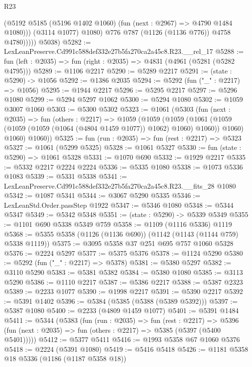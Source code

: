 \begin{lexlean}{R23}
\begin{coremodule}
                    (@5192 @5185 (@5196 @1402 @1060) (fun (next : @2967) => @4790 @1484 @1080)))
                  (@3114 @1077)
                  @1080)
                @776
                @787
                (@1126 (@1136 @776))
                @4758
                @4780)))))
      @5038)
@5282 := LexLeanPreserve.Cd991c588def332e27b5fa270ca2a45c8.R23.__rel_17
@5288 := fun (left : @2035) => fun (right : @2035) => @4831 (@4961 (@5281 (@5282 @4795)))
@5289 := @1106 @2217
@5290 := @5289 @2217
@5291 := (state : @5290) -> @1056
@5292 := @1386 @2035
@5294 := @5292 (fun ("_" : @2217) => @1056)
@5295 := @1944 @2217
@5296 := @5295 @2217
@5297 := @5296 @1080
@5299 := @5294 @5297 @1062
@5300 := @5294 @1080
@5302 := @1059 @3007 @1060
@5303 := @5300 @5302
@5323 := @1061
    (@5303
      (fun (next : @2035) =>
      fun (others : @2217) =>
      @1059
        (@1059
          (@1059
            (@1061 (@1059 (@1059 (@1059 (@1064 (@4804 @1459 @1077)) @1062) @1060) @1060))
            @1060)
          @1060)
        @1060))
@5325 := fun (run : @2035) => fun (rest : @2217) => @5323
@5327 := @1061 (@5299 @5325)
@5328 := @1061 @5327
@5330 := fun (state : @5290) => @1061 @5328
@5331 := @1070 @690
@5332 := @1929 @2217
@5335 := @5332 @2217 @2224 @2224
@5336 := @5335 @1080
@5338 := @1073 @5336 @1083
@5339 := @5331 @5338
@5341 := LexLeanPreserve.Cd991c588def332e27b5fa270ca2a45c8.R23.__fits_28 @1080
@5342 := @1087 @5341
@5344 := @3067 @5290 @5335
@5346 := LexLeanStd.Order.passStep @1922
@5347 := @5346 @1080
@5348 := @5344 @5347
@5349 := @5342 @5348
@5351 := (state : @5290) -> @5339 @5349
@5355 := @1101 @690 @5338 @5349 @759
@5358 := @1109 (@1116 @5336) @1119
@5368 := @5355 @5358 (@1126 (@1136 @690)) (@1142 (@1143 (@1144 @759) @5338 @1119))
@5375 := @3095 @5358 @37 @251 @695 @757 @1060 @5328
@5376 := @2224 @5297
@5377 := @5375 @5376
@5378 := @1124 @5290
@5380 := @5292 (fun ("_" : @2217) => @5378)
@5381 := @5380 @5297
@5382 := @3110 @5290
@5383 := @5381 @5382
@5384 := @5380 @1080
@5385 := @3113 @5290
@5386 := @1110 @2217
@5387 := @5386 @2217
@5388 := @5387 @2323
@5389 := @2233 @1077
@5390 := @1998 @2217
@5391 := @5390 @2217
@5392 := @5391 @1402
@5396 := @5384 (@5385 (@5388 (@5389 @5392)))
@5397 := @5387 @1080
@5400 := @2233 (@4809 @1459 @1077)
@5401 := @5391 @1484
@5411 := @5344
    (@5383
      (fun (run : @2035) =>
      fun (rest : @2217) =>
      @5396 (fun (next : @2035) => fun (others : @2217) => @5385 (@5397 (@5400 @5401)))))
@5412 := @5377 @5411
@5416 := @1993 @5358 @67 @1060 @5376
@5418 := @2224 (@5391 @1080)
@5419 := @5416 @5418
@5426 := @1181 @5358 @18 @5336 (@1186 (@1187 @5358 @18))

\end{coremodule}
\end{lexlean}
